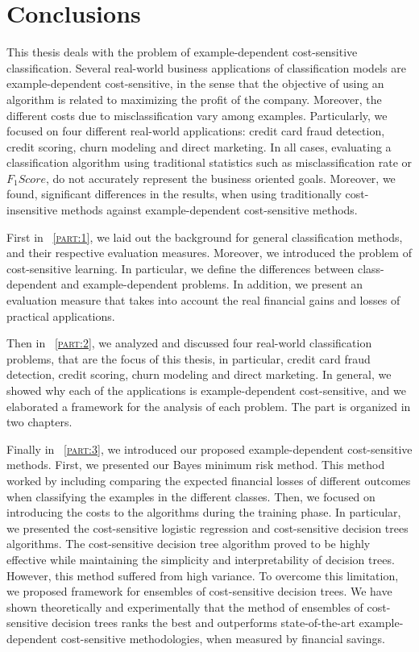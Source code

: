 \chapter{Conclusions}\label{ch:10}

This thesis deals with the problem of example-dependent cost-sensitive classification.
Several real-world business applications of classification models are example-dependent 
cost-sensitive, in the sense that the objective of using an algorithm is related to maximizing the 
profit of the company. Moreover, the different costs due to misclassification vary among examples. 
Particularly, we focused on four different real-world applications: credit card fraud 
detection, credit scoring, churn modeling and direct marketing. In all cases, evaluating a 
classification algorithm using traditional statistics such as misclassification rate or $F_1Score$, 
do not accurately represent the business oriented goals. Moreover, we found, significant 
differences in the results, when using traditionally cost-insensitive methods against 
example-dependent cost-sensitive methods.

First in \partname{~\textsc{\ref{part:1}}}, we laid out the background for general classification 
methods, and their respective evaluation measures. Moreover, we introduced the problem of 
cost-sensitive learning. In particular, we define the differences between class-dependent and 
example-dependent problems. In addition, we present an evaluation measure that takes into account 
the real financial gains and losses of practical applications.

Then in \partname{~\textsc{\ref{part:2}}}, we analyzed and discussed four real-world 
classification problems, that are the focus of this thesis, in particular, credit card fraud 
detection, credit scoring, churn modeling and direct marketing. In general, we showed why each of 
the applications is example-dependent cost-sensitive, and we elaborated a framework for the 
analysis of each problem. The part is organized in two chapters.

Finally in \partname{~\textsc{\ref{part:3}}}, we introduced our proposed example-dependent 
cost-sensitive methods. First, we presented our Bayes minimum risk method. This method worked by 
including comparing the expected financial losses of different outcomes when classifying the 
examples in the different classes. Then, we focused on introducing the costs to the algorithms 
during the training phase. In particular, we presented the cost-sensitive logistic regression and  
cost-sensitive decision trees algorithms. The cost-sensitive decision tree algorithm proved to be 
highly effective while maintaining the simplicity and interpretability of decision trees. However, 
this method suffered from high variance. To overcome this limitation, we proposed framework for 
ensembles of cost-sensitive decision trees. We have shown theoretically and experimentally
that the method of ensembles of cost-sensitive decision trees ranks the best and outperforms 
state-of-the-art example-dependent cost-sensitive methodologies, when measured by financial savings.


